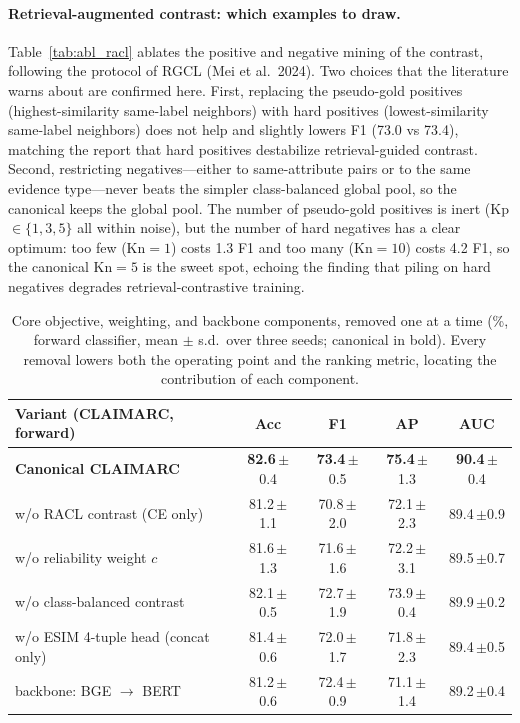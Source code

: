 \documentclass[11pt]{article}
\newcommand{\best}[1]{\textbf{#1}}
\begin{document}
\paragraph{Retrieval-augmented contrast: which examples to draw.}
Table~\ref{tab:abl_racl} ablates the positive and negative mining of the contrast,
following the protocol of RGCL (Mei et al.\ 2024). Two choices that the literature
warns about are confirmed here. First, replacing the pseudo-gold positives
(highest-similarity same-label neighbors) with hard positives (lowest-similarity
same-label neighbors) does not help and slightly lowers F1 (73.0 vs 73.4),
matching the report that hard positives destabilize retrieval-guided contrast.
Second, restricting negatives---either to same-attribute pairs or to the same
evidence type---never beats the simpler class-balanced global pool, so the
canonical keeps the global pool. The number of pseudo-gold positives is inert
(Kp $\in\{1,3,5\}$ all within noise), but the number of hard negatives has a clear
optimum: too few (Kn$=1$) costs 1.3 F1 and too many (Kn$=10$) costs 4.2 F1, so the
canonical Kn$=5$ is the sweet spot, echoing the finding that piling on hard
negatives degrades retrieval-contrastive training.

\begin{table}[t]
\centering\small
\setlength{\tabcolsep}{6pt}
\newcommand{\pmsd}[1]{\,{\scriptsize$\pm$#1}}
\begin{tabular}{lcccc}
\toprule
\textbf{Variant (CLAIMARC, forward)} & \textbf{Acc} & \textbf{F1} & \textbf{AP} & \textbf{AUC} \\
\midrule
\textbf{Canonical CLAIMARC}          & \best{82.6}\pmsd{0.4} & \best{73.4}\pmsd{0.5} & \best{75.4}\pmsd{1.3} & \best{90.4}\pmsd{0.4} \\
\midrule
\quad w/o RACL contrast (CE only)    & 81.2\pmsd{1.1} & 70.8\pmsd{2.0} & 72.1\pmsd{2.3} & 89.4\pmsd{0.9} \\
\quad w/o reliability weight $c$     & 81.6\pmsd{1.3} & 71.6\pmsd{1.6} & 72.2\pmsd{3.1} & 89.5\pmsd{0.7} \\
\quad w/o class-balanced contrast    & 82.1\pmsd{0.5} & 72.7\pmsd{1.9} & 73.9\pmsd{0.4} & 89.9\pmsd{0.2} \\
\quad w/o ESIM 4-tuple head (concat only) & 81.4\pmsd{0.6} & 72.0\pmsd{1.7} & 71.8\pmsd{2.3} & 89.4\pmsd{0.5} \\
\quad backbone: BGE $\to$ BERT       & 81.2\pmsd{0.6} & 72.4\pmsd{0.9} & 71.1\pmsd{1.4} & 89.2\pmsd{0.4} \\
\bottomrule
\end{tabular}
\caption{Core objective, weighting, and backbone components, removed one at a time
(\%, forward classifier, mean $\pm$ s.d.\ over three seeds; canonical in bold).
Every removal lowers both the operating point and the ranking metric, locating
the contribution of each component.}
\label{tab:abl}
\end{table}
\end{document}
